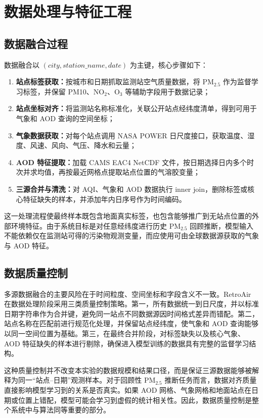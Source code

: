 ﻿\documentclass[UTF8,zihao=-4,a4paper]{ctexart}
\newcommand{\pmfine}{PM$_{2.5}$}
\newcommand{\aod}{AOD}
\begin{document}
\section{数据处理与特征工程}

\subsection{数据融合过程}

数据融合以 $(city, station\_name, date)$ 为主键，核心步骤如下：

\begin{enumerate}
  \item \textbf{站点标签获取：}按城市和日期抓取监测站空气质量数据，将 \pmfine{} 作为监督学习标签，并保留 PM10、NO$_2$、O$_3$ 等辅助字段用于数据记录；
  \item \textbf{站点坐标对齐：}将监测站名称标准化，关联公开站点经纬度清单，得到可用于气象和 \aod{} 查询的空间坐标；
  \item \textbf{气象数据获取：}对每个站点调用 NASA POWER 日尺度接口，获取温度、湿度、风速、风向、气压、降水和云量；
  \item \textbf{\aod{} 特征提取：}加载 CAMS EAC4 NetCDF 文件，按日期选择日内多个时次并求均值，再按最近网格点提取站点位置的气溶胶变量；
  \item \textbf{三源合并与清洗：}对 AQI、气象和 \aod{} 数据执行 inner join，删除标签或核心特征缺失的样本，并添加年内日序号作为时间编码。
\end{enumerate}

这一处理流程使最终样本既包含地面真实标签，也包含能够推广到无站点位置的外部环境特征。由于系统目标是对任意经纬度进行历史 \pmfine{} 回顾推断，模型输入不能依赖仅在监测站可得的污染物观测变量，而应使用可由全球数据源获取的气象与 \aod{} 特征。

\subsection{数据质量控制}

多源数据融合的主要风险在于时间粒度、空间坐标和字段含义不一致。RetroAir 在数据处理阶段采用三类质量控制策略。第一，所有数据统一到日尺度，并以标准日期字符串作为合并键，避免同一站点不同数据源因时间格式差异而错配。第二，站点名称在匹配前进行规范化处理，并保留站点经纬度，使气象和 \aod{} 查询能够以同一空间位置为基础。第三，在最终合并阶段，对标签缺失以及核心气象、\aod{} 特征缺失的样本进行剔除，确保进入模型训练的数据具有完整的监督学习结构。

这种质量控制并不改变本实验的数据规模和结果口径，而是保证三源数据能够被解释为同一“站点--日期”观测样本。对于回顾性 \pmfine{} 推断任务而言，数据对齐质量直接影响模型学习到的关系是否真实。如果 \aod{} 网格、气象网格和地面站点在日期或位置上错配，模型可能会学习到虚假的统计相关性。因此，数据质量控制是整个系统中与算法同等重要的部分。
\end{document}
